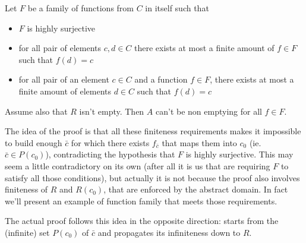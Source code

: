 \begin{theorem}\label{ch4:th:non-empt-res-global}
	Let $F$ be a family of functions from $C$ in itself such that
	\begin{itemize}
		\item $F$ is highly surjective
		\item for all pair of elements $c, d \in C$ there exists at most a finite amount of $f \in F$ such that $f(d) = c$
		\item for all pair of an element $c \in C$ and a function $f \in F$, there exists at most a finite amount of elements $d \in C$ such that $f(d) = c$
	\end{itemize}
	Assume also that $R$ isn't empty. Then $A$ can't be non emptying for all $f \in F$.
\end{theorem}

The idea of the proof is that all these finiteness requirements makes it impossible to build enough $\bar{c}$ for which there exists $f_{\bar{c}}$ that maps them into $c_0$ (ie. $\bar{c} \in P(c_0)$), contradicting the hypothesis that $F$ is highly surjective. This may seem a little contradictory on its own (after all it is us that are requiring $F$ to satisfy all those conditions), but actually it is not because the proof also involves finiteness of $R$ and $R(c_0)$, that are enforced by the abstract domain. In fact we'll present an example of function family that meets those requirements.

The actual proof follows this idea in the opposite direction: starts from the (infinite) set $P(c_0)$ of $\bar{c}$ and propagates its infiniteness down to $R$.

